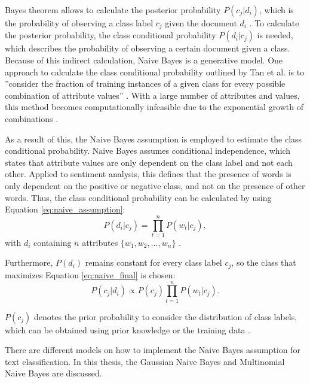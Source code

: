         Bayes theorem allows to calculate the posterior probability $P(c_j|d_i)$, which is the probability of observing a class label $c_j$ given the document $d_i$ \cite{DBLP:books/aw/TanSKK2019}. To calculate the posterior probability, the class conditional probability $P(d_i|c_j)$ is needed, which describes the probability of observing a certain document given a class. Because of this indirect calculation, Naive Bayes is a generative model. One approach to calculate the class conditional probability outlined by Tan et al. is to ''consider the fraction of training instances of a given class for every possible combination of attribute values'' \cite[p.~419]{DBLP:books/aw/TanSKK2019}. With a large number of attributes and values, this method becomes computationally infeasible due to the exponential growth of combinations \cite{DBLP:books/aw/TanSKK2019}.

        As a result of this, the Naive Bayes assumption is employed to estimate the class conditional probability. Naive Bayes assumes conditional independence, which states that attribute values are only dependent on the class label and not each other. Applied to sentiment analysis, this defines that the presence of words is only dependent on the positive or negative class, and not on the presence of other words. Thus, the class conditional probability can be calculated by using Equation \eqref{eq:naive_assumption}:
        \begin{equation}
            \label{eq:naive_assumption}
            P(d_i|c_j) = \prod_{t=1}^{n}P(w_{t}|c_j),
        \end{equation}
        with $d_i$ containing $n$ attributes $\{w_1,w_2,...,w_n\}$ \cite{DBLP:books/aw/TanSKK2019}.

        Furthermore, $P(d_i)$ remains constant for every class label $c_j$, so the class that maximizes Equation \eqref{eq:naive_final} is chosen: 
        \begin{equation}
            \label{eq:naive_final}
            P(c_j|d_i)\propto P(c_j)\prod_{t=1}^{n}P(w_{t}|c_j) .
        \end{equation}   
        
        $P(c_j)$ denotes the prior probability to consider the distribution of class labels, which can be obtained using prior knowledge or the training data \cite{DBLP:books/aw/TanSKK2019}.
        
        There are different models on how to implement the Naive Bayes assumption for text classification. In this thesis, the Gaussian Naive Bayes and Multinomial Naive Bayes are discussed. 
        
